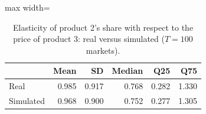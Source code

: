 \begin{table}[H]
\centering\small
\caption{Elasticity of product 2's share with respect to the price of product 3: real versus simulated ($T=100$ markets).}\label{tab:q8d_cell_23}
\begin{adjustbox}{max width=\linewidth}
\begin{tabular}{lrrrrr}
\toprule
 & Mean & SD & Median & Q25 & Q75 \\
\midrule
Real & 0.985 & 0.917 & 0.768 & 0.282 & 1.330 \\
Simulated & 0.968 & 0.900 & 0.752 & 0.277 & 1.305 \\
\bottomrule
\end{tabular}
\end{adjustbox}
\par\vspace{3pt}{\footnotesize Element $(2,3)$ of the elasticity matrix $\partial s_j/\partial p_k\cdot p_k/s_j$ across the 100 markets; simulated uses the Q8c estimates, real uses the true parameters.}
\end{table}
